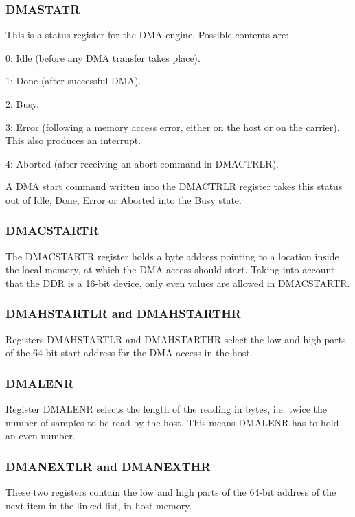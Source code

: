 \documentclass[10pt,a4paper]{cerndoc}
\begin{document}
\subsubsection{DMASTATR}
This is a status register for the DMA engine. Possible contents are:
\begin{packed_item}
\item 0: Idle (before any DMA transfer takes place).
\item 1: Done (after successful DMA).
\item 2: Busy.
\item 3: Error (following a memory access error, either on the host or on the carrier). This also produces an interrupt.
\item 4: Aborted (after receiving an abort command in DMACTRLR).
\end{packed_item}
A DMA start command written into the DMACTRLR register takes this status out of Idle, Done, Error or Aborted into the Busy state.

\subsubsection{DMACSTARTR}
The DMACSTARTR register holds a byte address pointing to a location inside the local memory, at which the DMA access should start. Taking into account that the DDR is a 16-bit device, only even values are allowed in DMACSTARTR.

\subsubsection{DMAHSTARTLR and DMAHSTARTHR}
Registers DMAHSTARTLR and DMAHSTARTHR select the low and high parts of the 64-bit start address for the DMA access in the host. 

\subsubsection{DMALENR}
Register DMALENR selects the length of the reading in bytes, i.e. twice the number of samples to be read by the host. This means DMALENR has to hold an even number.

\subsubsection{DMANEXTLR and DMANEXTHR}
These two registers contain the low and high parts of the 64-bit address of the next item in the linked list, in host memory.
\end{document}
